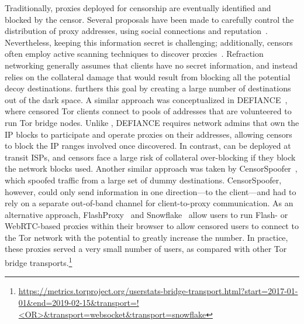 Traditionally, proxies deployed for censorship are eventually identified and
blocked by the censor. Several proposals have been made to carefully control
the distribution of proxy addresses, using social connections and
reputation~\cite{proximax,rbridge,salmon}. Nevertheless, keeping this
information secret is challenging; additionally, censors often employ active
scanning techniques to discover proxies~\cite{Dunna2018a}. Refraction
networking generally assumes that clients have no secret information, and
instead relies on the  collateral damage that would result from blocking all
the potential decoy destinations. \scheme furthers this goal by creating a
large number of destinations out of the dark space. A similar approach was
conceptualized in DEFIANCE~\cite{lincoln2012}, where censored Tor clients
connect to pools of addresses that are volunteered to run Tor bridge nodes.
Unlike \scheme, DEFIANCE requires network admins that own the IP blocks to
participate and operate proxies on their addresses, allowing censors to block
the IP ranges involved once discovered. In contrast, \scheme can be
deployed at transit ISPs, and censors face a large risk of collateral
over-blocking if they block the network blocks used.
Another similar approach was
taken by CensorSpoofer~\cite{censorspoofer}, which spoofed traffic from a large
set of dummy destinations. CensorSpoofer, however, could only send information
in one direction---to the client---and had to rely on a separate out-of-band
channel for client-to-proxy communication. As an alternative approach,
FlashProxy~\cite{flash-proxies} and Snowflake~\cite{snowflake} allow users to
run Flash- or WebRTC-based proxies within their browser to allow censored users
to connect to the Tor network with the potential to greatly increase the
number. In practice, these proxies served a very small number of users, as
compared with other Tor bridge transports.\footnote{\url{https://metrics.torproject.org/userstats-bridge-transport.html?start=2017-01-01&end=2019-02-15&transport=!<OR>&transport=websocket&transport=snowflake}}
